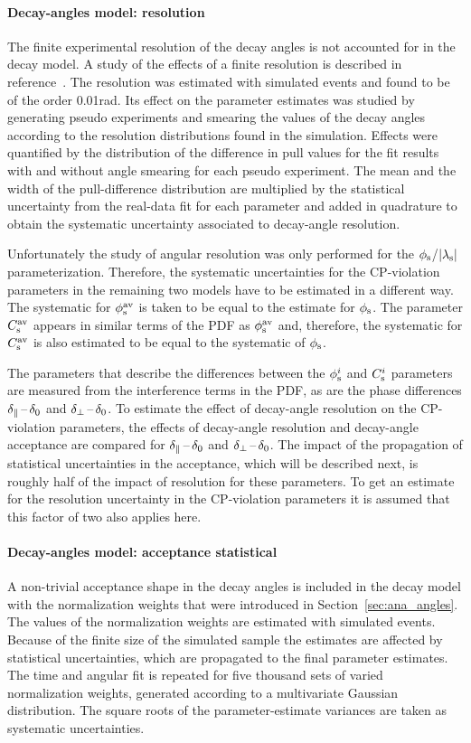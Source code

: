 \paragraph{Decay-angles model: resolution}
The finite experimental resolution of the decay angles is not accounted for in the decay model. A study of the effects of a finite
resolution is described in reference~\cite{LHCb-ANA-2014-039}. The resolution was estimated with simulated events and found to be of the
order 0.01\unitsp{}rad. Its effect on the parameter estimates was studied by generating pseudo experiments and smearing the values of the
decay angles according to the resolution distributions found in the simulation. Effects were quantified by the distribution of the
difference in pull values for the fit results with and without angle smearing for each pseudo experiment. The mean and the width of the
pull-difference distribution are multiplied by the statistical uncertainty from the real-data fit for each parameter and added in
quadrature to obtain the systematic uncertainty associated to decay-angle resolution.

Unfortunately the study of angular resolution was only performed for the $\phi_\text{s}$/$|{\lambda_{\text{s}}}|$ parameterization. Therefore, the systematic
uncertainties for the CP-violation parameters in the remaining two models have to be estimated in a different way. The systematic
for $\phi_\text{s}^{\text{av}}$ is taken to be equal to the estimate for $\phi_\text{s}$. The parameter $C_\text{s}^\text{av}$ appears in similar terms of the PDF as $\phi_\text{s}^{\text{av}}$ and,
therefore, the systematic for $C_\text{s}^\text{av}$ is also estimated to be equal to the systematic of $\phi_\text{s}$.

The parameters that describe the differences between the $\phi_\text{s}^{i}$ and $C_\text{s}^{i}$ parameters are measured from the interference terms in the
PDF, as are the phase differences $\delta_{\parallel}\,\text{--}\,\delta_{0}$ and $\delta_{\perp}\,\text{--}\,\delta_{0}$. To estimate the effect of decay-angle resolution on the CP-violation
parameters, the effects of decay-angle resolution and decay-angle acceptance are compared for $\delta_{\parallel}\,\text{--}\,\delta_{0}$ and $\delta_{\perp}\,\text{--}\,\delta_{0}$. The impact
of the propagation of statistical uncertainties in the acceptance, which will be described next, is roughly half of the impact of
resolution for these parameters. To get an estimate for the resolution uncertainty in the CP-violation parameters it is assumed that this
factor of two also applies here.

\paragraph{Decay-angles model: acceptance statistical}
A non-trivial acceptance shape in the decay angles is included in the decay model with the normalization weights that were introduced in
Section~\ref{sec:ana_angles}. The values of the normalization weights are estimated with simulated events. Because of the finite size of
the simulated sample the estimates are affected by statistical uncertainties, which are propagated to the final parameter estimates. The
time and angular fit is repeated for five thousand sets of varied normalization weights, generated according to a multivariate Gaussian
distribution. The square roots of the parameter-estimate variances are taken as systematic uncertainties.

